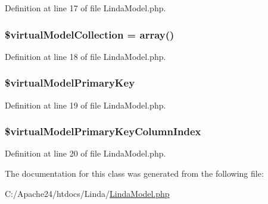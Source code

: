 Definition at line 17 of file Linda\+Model.\+php.

\hypertarget{class_linda_model_a1b40070fc765a8a4f2af137240160b50}{}
\subsubsection[{\$virtual\+Model\+Collection}]{\setlength{\rightskip}{0pt plus 5cm}\$virtual\+Model\+Collection = array()\hspace{0.3cm}{\ttfamily [protected]}}\label{class_linda_model_a1b40070fc765a8a4f2af137240160b50}


Definition at line 18 of file Linda\+Model.\+php.

\hypertarget{class_linda_model_ac155ae9a10f7fe23e69866ef520cc40a}{}
\subsubsection[{\$virtual\+Model\+Primary\+Key}]{\setlength{\rightskip}{0pt plus 5cm}\$virtual\+Model\+Primary\+Key\hspace{0.3cm}{\ttfamily [protected]}}\label{class_linda_model_ac155ae9a10f7fe23e69866ef520cc40a}


Definition at line 19 of file Linda\+Model.\+php.

\hypertarget{class_linda_model_aa95536b6b03272be51030ebe03626f38}{}
\subsubsection[{\$virtual\+Model\+Primary\+Key\+Column\+Index}]{\setlength{\rightskip}{0pt plus 5cm}\$virtual\+Model\+Primary\+Key\+Column\+Index\hspace{0.3cm}{\ttfamily [protected]}}\label{class_linda_model_aa95536b6b03272be51030ebe03626f38}


Definition at line 20 of file Linda\+Model.\+php.



The documentation for this class was generated from the following file\+:\begin{DoxyCompactItemize}
\item 
C\+:/\+Apache24/htdocs/\+Linda/\hyperlink{_linda_model_8php}{Linda\+Model.\+php}\end{DoxyCompactItemize}
